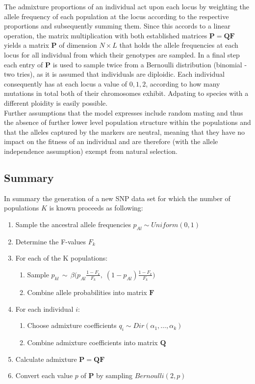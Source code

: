 \documentclass[a4paper, 11pt]{article}
\begin{document}
The admixture proportions of an individual act upon each locus by weighting the allele frequency of each population at the locus according to the respective proportions and subsequently summing them. Since this accords to a linear operation, the matrix multiplication with both established matrices $\mathbf{P} = \mathbf{Q}\mathbf{F}$ yields a matrix $\mathbf{P}$ of dimension $N \times L$ that holds the allele frequencies at each locus for all individual from which their genotypes are sampled. In a final step each entry of $\mathbf{P}$ is used to sample twice from a Bernoulli distribution (binomial - two tries), as it is assumed that individuals are diploidic. Each individual consequently has at each locus a value of $0, 1, 2$, according to how many mutations in total both of their chromosomes exhibit. Adpating to species with a different ploidity is easily possible.\\

Further assumptions that the model expresses include random mating and thus the absence of further lower level population structure within the populations and that the alleles captured by the markers are neutral, meaning that they have no impact on the fitness of an individual and are therefore (with the allele independence assumption) exempt from natural selection.

\subsection{Summary}
In summary the generation of a new SNP data set for which the number of populations $K$ is known proceeds as following:
\begin{enumerate}
\item Sample the ancestral allele frequencies $p_{Al} \sim Uniform(0, 1)$
\item Determine the F-values $F_k$
\item  For each of the K populations:
\begin{enumerate}
\item Sample $p_{kl}\, \sim\, \beta\big(p_{Al} \frac{1 - F_k}{F_k},\; (1-p_{Al}) \frac{1 - F_k}{F_k}\big)$
\item Combine allele probabilities into matrix $\mathbf{F}$
\end{enumerate} 
\item For each individual $i$:
\begin{enumerate}
\item Choose admixture coefficients $q_i \sim Dir(\alpha_1, \ldots, \alpha_k)$
\item Combine admixture coefficients into matrix $\mathbf{Q}$
\end{enumerate}
\item Calculate admixture $\mathbf{P} = \mathbf{Q}\mathbf{F}$
\item Convert each value $p$ of $\mathbf{P}$ by sampling $Bernoulli(2, p)$
\end{enumerate}
\end{document}
